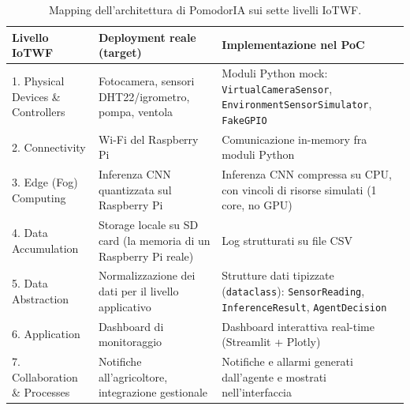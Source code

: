 \begin{table}[h]
\centering
\small
\begin{tabular}{@{}p{2.6cm}p{5.6cm}p{5.6cm}@{}}
\toprule
\textbf{Livello IoTWF} & \textbf{Deployment reale (target)} & \textbf{Implementazione nel PoC} \\
\midrule
1. Physical Devices \& Controllers &
Fotocamera, sensori DHT22/igrometro, pompa, ventola &
Moduli Python mock: \texttt{VirtualCameraSensor}, \texttt{EnvironmentSensorSimulator}, \texttt{FakeGPIO} \\
2. Connectivity &
Wi-Fi del Raspberry Pi &
Comunicazione in-memory fra moduli Python \\
3. Edge (Fog) Computing &
Inferenza CNN quantizzata sul Raspberry Pi &
Inferenza CNN compressa su CPU, con vincoli di risorse simulati (1 core, no GPU) \\
4. Data Accumulation &
Storage locale su SD card (la memoria di un Raspberry Pi reale) &
Log strutturati su file CSV \\
5. Data Abstraction &
Normalizzazione dei dati per il livello applicativo &
Strutture dati tipizzate (\texttt{dataclass}): \texttt{SensorReading}, \texttt{InferenceResult}, \texttt{AgentDecision} \\
6. Application &
Dashboard di monitoraggio &
Dashboard interattiva real-time (Streamlit + Plotly) \\
7. Collaboration \& Processes &
Notifiche all'agricoltore, integrazione gestionale &
Notifiche e allarmi generati dall'agente e mostrati nell'interfaccia \\
\bottomrule
\end{tabular}
\caption*{Mapping dell'architettura di PomodorIA sui sette livelli IoTWF.}
\label{tab:iotwf}
\end{table}
